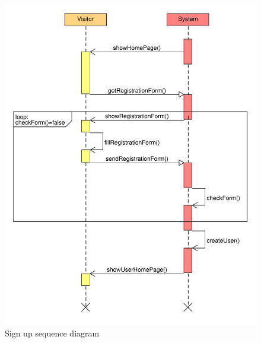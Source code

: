 \begin{figure}
\centering
\includegraphics[width=\textwidth]{tex-images/sequence-signup}
\caption{Sign up sequence diagram}
\end{figure}



